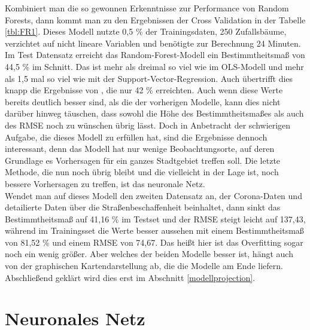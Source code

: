 \documentclass[a4paper,12pt]{thesis}
\begin{document}
Kombiniert man die so gewonnen Erkenntnisse zur Performance von Random Forests, dann kommt man zu den Ergebnissen der Cross Validation in der Tabelle \ref{tbl:FR1}. Dieses Modell nutzte 0,5 \% der Trainingsdaten, 250 Zufallsbäume, verzichtet auf nicht lineare Variablen und benötigte zur Berechnung 24 Minuten. Im Test Datensatz erreicht das Random-Forest-Modell ein Bestimmtheitsmaß von 44,5 \% im Schnitt. Das ist mehr als dreimal so viel wie im OLS-Modell und mehr als 1,5 mal so viel wie mit der Support-Vector-Regression. Auch übertrifft dies knapp die Ergebnisse von \cite{Alattar2021}, die nur 42 \% erreichten. Auch wenn diese Werte bereits deutlich besser sind, als die der vorherigen Modelle, kann dies nicht darüber hinweg täuschen, dass sowohl die Höhe des Bestimmtheitsmaßes als auch des RMSE noch zu wünschen übrig lässt. Doch in Anbetracht der schwierigen Aufgabe, die dieses Modell zu erfüllen hat, sind die Ergebnisse dennoch interessant, denn das Modell hat nur wenige Beobachtungsorte, auf deren Grundlage es Vorhersagen für ein ganzes Stadtgebiet treffen soll. Die letzte Methode, die nun noch übrig bleibt und die vielleicht in der Lage ist, noch bessere Vorhersagen zu treffen, ist das neuronale Netz.\\

Wendet man auf dieses Modell den zweiten Datensatz an, der Corona-Daten und detailierte Daten über die Straßenbeschaffenheit beinhaltet, dann sinkt das Bestimmtheitsmaß auf 41,16 \% im Testset und der RMSE steigt leicht auf 137,43, während im Trainingsset die Werte besser aussehen mit einem Bestimmtheitsmaß von 81,52 \% und einem RMSE von 74,67. Das heißt hier ist das Overfitting sogar noch ein wenig größer. Aber welches der beiden Modelle besser ist, hängt auch von der graphischen Kartendarstellung ab, die die Modelle am Ende liefern. Abschließend geklärt wird dies erst im Abschnitt \ref{modellprojection}.

\section{Neuronales Netz}
\end{document}
